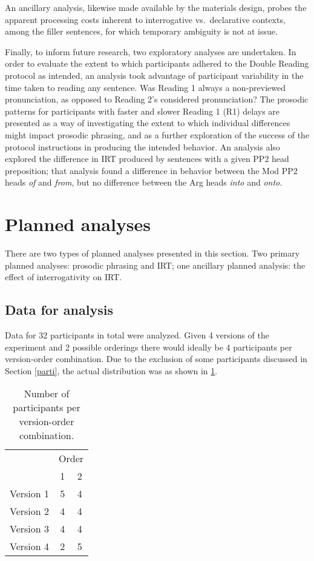 \documentclass[11pt,oneside]{book}
\begin{document}
An ancillary analysis, likewise made available by the materials design, probes the apparent processing costs inherent to interrogative vs.~declarative contexts, among the filler sentences, for which temporary ambiguity is not at issue.

Finally, to inform future research, two exploratory analyses are undertaken. In order to evaluate the extent to which participants adhered to the Double Reading protocol as intended, an analysis took advantage of participant variability in the time taken to reading any sentence. Was Reading 1 always a non-previewed pronunciation, as opposed to Reading 2's considered pronunciation? The prosodic patterns for participants with faster and slower Reading 1 (R1) delays are presented as a way of investigating the extent to which individual differences might impact prosodic phrasing, and as a further exploration of the success of the protocol instructions in producing the intended behavior. An analysis also explored the difference in IRT produced by sentences with a given PP2 head preposition; that analysis found a difference in behavior between the Mod PP2 heads \emph{of} and \emph{from}, but no difference between the Arg heads \emph{into} and \emph{onto}.

\hypertarget{planned-analyses}{%
\section{Planned analyses}\label{planned-analyses}}

There are two types of planned analyses presented in this section. Two primary planned analyses: prosodic phrasing and IRT; one ancillary planned analysis: the effect of interrogativity on IRT.

\hypertarget{data}{%
\subsection{Data for analysis}\label{data}}

Data for 32 participants in total were analyzed. Given 4 versions of the experiment and 2 possible orderings there would ideally be 4 participants per version-order combination. Due to the exclusion of some participants discussed in Section \ref{parti}, the actual distribution was as shown in \ref{tab:vtab}.

\begin{table}[!h]

\caption{\label{tab:vtab}Number of participants per version-order combination.}
\centering
\begin{tabular}{lcc}
\toprule
\multicolumn{1}{c}{ } & \multicolumn{2}{c}{Order} \\
\cmidrule(l{3pt}r{3pt}){2-3}
  & 1 & 2\\
\midrule
Version 1 & 5 & 4\\
Version 2 & 4 & 4\\
Version 3 & 4 & 4\\
Version 4 & 2 & 5\\
\bottomrule
\end{tabular}
\end{table}
\end{document}

